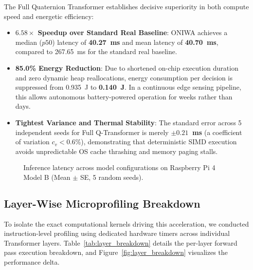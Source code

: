 \documentclass[10pt,twocolumn,letterpaper]{article}
\begin{document}
The Full Quaternion Transformer establishes decisive superiority in both compute speed and energetic efficiency:
\begin{itemize}
    \item \textbf{$6.58\times$ Speedup over Standard Real Baseline}: ONIWA achieves a median ($p50$) latency of \textbf{40.27~ms} and mean latency of \textbf{40.70~ms}, compared to 267.65~ms for the standard real baseline.
    \item \textbf{85.0\% Energy Reduction}: Due to shortened on-chip execution duration and zero dynamic heap reallocations, energy consumption per decision is suppressed from 0.935~J to \textbf{0.140~J}. In a continuous edge sensing pipeline, this allows autonomous battery-powered operation for weeks rather than days.
    \item \textbf{Tightest Variance and Thermal Stability}: The standard error across 5 independent seeds for Full Q-Transformer is merely \textbf{$\pm 0.21$~ms} (a coefficient of variation $c_v < 0.6\%$), demonstrating that deterministic SIMD execution avoids unpredictable OS cache thrashing and memory paging stalls.
\end{itemize}


\begin{figure}[htbp]
\centering
{}
\caption{Inference latency across model configurations on Raspberry Pi 4 Model B (Mean $\pm$ SE, 5 random seeds).}
\label{fig:latency_comparison}
\end{figure}

\subsection{Layer-Wise Microprofiling Breakdown}
To isolate the exact computational kernels driving this acceleration, we conducted instruction-level profiling using dedicated hardware timers across individual Transformer layers. Table~\ref{tab:layer_breakdown} details the per-layer forward pass execution breakdown, and Figure~\ref{fig:layer_breakdown} visualizes the performance delta.
\end{document}
